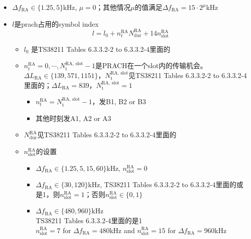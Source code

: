 \documentclass{article}
\begin{document}
\begin{itemize}
\begin{itemize}
	\[
	N_{\text{CP}, l}^\mu = 
	\begin{cases}
	512\kappa \cdot 2^{-\mu} 			& \text{extended CP} \\
	144\kappa \cdot 2^{-\mu} + 16\kappa 	& \text{normal CP, }  l\in \{0, 7\cdot 2^\mu\} \\
	144\kappa \cdot 2^{-\mu} 			& \text{normal CP, }  l\notin \{0, 7\cdot 2^\mu\}  \\
	\end{cases}
	\]
	\item $\Delta f_{\text{RA}} \in\{1.25, 5\}$kHz, $\mu=0$；其他情况$\mu$的值满足$\Delta f_{\text{RA}}=15\cdot 2^\mu$kHz
	\item $l$是prach占用的symbol index
	\[
	l = l_0 + n^{\text{RA}}_tN^{\text{RA}}_{\text{dur}} + 14n^{\text{RA}}_{\text{slot}}
	\]
		\begin{itemize}
		\item $l_0$ 是TS38211 Tables 6.3.3.2-2 to 6.3.3.2-4里面的{\color{darkred}{starting symbol}}\cite{38211}
		\item $n^{\text{RA}}_t=0,\cdots,N_{\text{t}}^{\text{RA, slot}}-1$是PRACH在一个slot内的传输机会。$\Delta L_{\text{RA}} \in\{139, 571, 1151\}$，$N_{\text{t}}^{\text{RA, slot}}$见TS38211 Tables 6.3.3.2-2 to 6.3.3.2-4里面的{\color{darkred}{number of time-domain PRACH occasions within a PRACH slot}}\cite{38211}；$\Delta L_{\text{RA}} = 839$，$N_{\text{t}}^{\text{RA, slot}}=1$\\
		
		{}\cite{38211}
			\begin{itemize}
			\item $n^{\text{RA}}_t=N_{\text{t}}^{\text{RA, slot}}-1$，发B1, B2 or B3
			\item 其他时刻发A1, A2 or A3
			\end{itemize}					
		
		\item $N^{\text{RA}}_{\text{dur}}$见TS38211 Tables 6.3.3.2-2 to 6.3.3.2-4里面的{\color{darkred}{PRACH duration}}\cite{38211}
		
		\item $n^{\text{RA}}_{\text{slot}}$的设置
			\begin{itemize}
			\item $\Delta f_{\text{RA}} \in\{1.25, 5, 15, 60\}$kHz, $n^{\text{RA}}_{\text{slot}}=0$
			\item $\Delta f_{\text{RA}} \in\{30, 120\}$kHz, TS38211 Tables 6.3.3.2-2 to 6.3.3.2-4里面的{\color{darkred}{Number of PRACH slots within a subframe}}或{\color{darkred}{Number of PRACH slots within a 60 kHz slot}}是1，则$n^{\text{RA}}_{\text{slot}}=1$；否则$n^{\text{RA}}_{\text{slot}}\in\{0,1\}$\cite{38211}
			\item $\Delta f_{\text{RA}} \in\{480, 960\}$kHz\\
			TS38211 Tables 6.3.3.2-4里面的{\color{darkred}{Number of PRACH slots within a 60 kHz slot}}是1\\
			$n^{\text{RA}}_{\text{slot}}=7$ for $\Delta f_{\text{RA}}=480$kHz and $n^{\text{RA}}_{\text{slot}}=15$ for $\Delta f_{\text{RA}}=960$kHz
			

\end{itemize}
\end{itemize}
\end{itemize}
\end{itemize}
\end{document}
